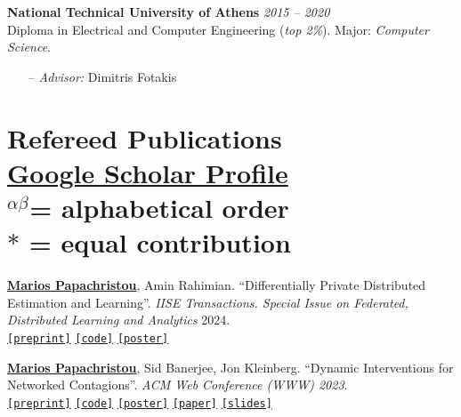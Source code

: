 \documentclass[margin]{res}
\newcommand{\field}[2]{\noindent \textbf{#1} \hfill #2 \\}
\newcommand{\alphabeticalorder}[0]{\ensuremath {^{\alpha \beta}}}
\newcommand{\specialurl}[2]{\href {#2} {\texttt{[#1]}}}
\newcommand{\preprint}[1]{\specialurl {preprint} {#1}}
\newcommand{\code}[1]{\specialurl {code} {#1}}
\newcommand{\slides}[1]{\specialurl {slides} {#1}}
\newcommand{\poster}[1]{\specialurl {poster} {#1}}
\newcommand{\paper}[1]{\specialurl {paper} {#1}}
\newcommand{\authorref}[1]{\underline {\textbf{#1}}}
\newcommand{\authorme}{\authorref{Marios Papachristou}}
\begin{document}
\begin{resume}
\field{National Technical University of Athens}  {\emph{2015 -- 2020}} 
Diploma in Electrical and Computer Engineering (\emph{top 2\%}). Major: \emph{Computer Science}.
\begin{itemize}[nosep]
\item[--] \emph{Advisor:} Dimitris Fotakis

\end{itemize} 

\section{Refereed Publications\\ {
\footnotesize
\textup{\href{https://scholar.google.gr/citations?user=T12JO3MAAAAJ&hl=en}{Google Scholar Profile}} \\\alphabeticalorder  = \textup{alphabetical order} \\ $*$ = \textup{equal contribution}
}}

\begin{enumerate}[nosep, label={[P\arabic*]}]    


   \item \authorme, Amin Rahimian. ``Differentially Private Distributed Estimation and Learning''. \emph{IISE Transactions. Special Issue on Federated, Distributed Learning and Analytics} 2024. \\
   	   \preprint{https://arxiv.org/abs/2306.15865} \code{https://github.com/papachristoumarios/dp-distributed-estimation} \poster{https://drive.google.com/file/d/149A7tdByRdOGHo_Xa_9H55qxExtESVhJ/view?usp=drive_link}

 
   \item \authorme, Sid Banerjee, Jon Kleinberg. ``Dynamic Interventions for Networked Contagions''. \emph{ACM Web Conference (WWW) 2023}. \\
		\preprint{https://arxiv.org/abs/2205.13394} \code{https://github.com/papachristoumarios/dynamic-clearing} \poster{https://drive.google.com/file/d/1l0TCsoZNo3NoOOHsPSh1ofctXD4ivFir/view?usp=sharing}
		\paper{https://dl.acm.org/doi/abs/10.1145/3543507.3583470}
		\slides{https://drive.google.com/file/d/1ZZ6F6PFNsBjYKFyurkwM2IbenuzXJEAs/view?usp=share_link}



\end{enumerate}
\end{resume}
\end{document}
